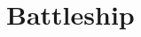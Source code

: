 \chapter{Battleship}
\hypertarget{md__r_e_a_d_m_e}{}\label{md__r_e_a_d_m_e}
\label{md__r_e_a_d_m_e_autotoc_md0}%
%
